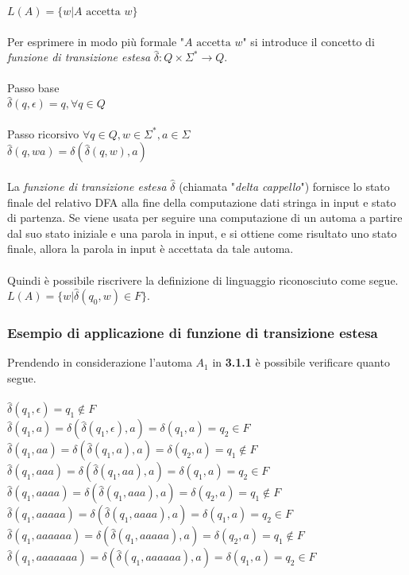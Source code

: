 \documentclass[]{article}
\begin{document}
\mbox{$L(A) = \{ w | A \text{ accetta } w \}$}
\\
\\
Per esprimere in modo più formale "\mbox{$A \text{ accetta } w$}" si introduce il concetto di
\textit{funzione di transizione estesa} \mbox{$\hat\delta \colon Q \times \Sigma^* \to Q$}.
\\
\\
Passo base
\\
\mbox{$\hat\delta(q, \epsilon) = q, \forall q \in Q$}
\\
\\
Passo ricorsivo \mbox{$\forall q \in Q, w \in \Sigma^*, a \in \Sigma$}
\\
\mbox{$\hat\delta(q, wa) = \delta(\hat\delta(q, w), a)$}
\\
\\
La \textit{funzione di transizione estesa} \mbox{$\hat\delta$} (chiamata "\textit{delta cappello}") fornisce
lo stato finale del relativo DFA alla fine della computazione dati stringa in input e stato di partenza.
Se viene usata per seguire una computazione di un automa a partire dal suo stato iniziale e una parola in
input, e si ottiene come risultato uno stato finale, allora la parola in input è accettata da tale automa.
\\
\\
Quindi è possibile riscrivere la definizione di linguaggio riconosciuto come segue.
\\
\mbox{$L(A) = \{ w | \hat\delta(q_0, w) \in F \}$}.



\subsubsection{Esempio di applicazione di funzione di transizione estesa}

Prendendo in considerazione l'automa \mbox{$A_1$} in \textbf{3.1.1} è possibile verificare quanto segue.
\\
\\
\mbox{$ \hat\delta(q_1, \epsilon) = q_1 \not\in F $}
\\
\mbox{$ \hat\delta(q_1, a) = \delta( \hat\delta(q_1, \epsilon) , a) = \delta( q_1 , a) = q_2 \in F $}
\\
\mbox{$ \hat\delta(q_1, aa) = \delta( \hat\delta(q_1, a) , a) = \delta( q_2 , a) = q_1 \not\in F $}
\\
\mbox{$ \hat\delta(q_1, aaa) = \delta( \hat\delta(q_1, aa) , a) = \delta( q_1 , a) = q_2 \in F $}
\\
\mbox{$ \hat\delta(q_1, aaaa) = \delta( \hat\delta(q_1, aaa) , a) = \delta( q_2 , a) = q_1 \not\in F $}
\\
\mbox{$ \hat\delta(q_1, aaaaa) = \delta( \hat\delta(q_1, aaaa) , a) = \delta( q_1 , a) = q_2 \in F $}
\\
\mbox{$ \hat\delta(q_1, aaaaaa) = \delta( \hat\delta(q_1, aaaaa) , a) = \delta( q_2 , a) = q_1 \not\in F $}
\\
\mbox{$ \hat\delta(q_1, aaaaaaa) = \delta( \hat\delta(q_1, aaaaaa) , a) = \delta( q_1 , a) = q_2 \in F $}
\end{document}
